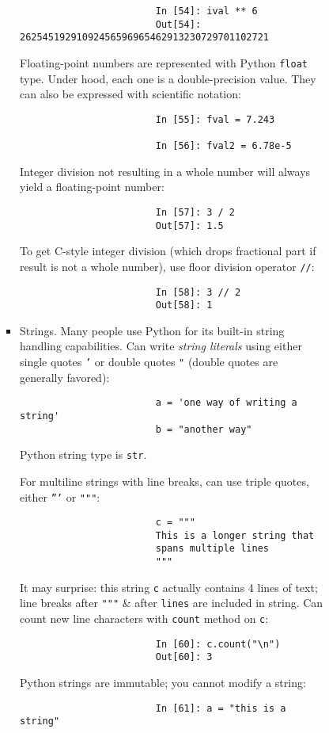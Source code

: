 \documentclass{article}
\begin{document}
\begin{enumerate}
\begin{itemize}
\begin{itemize}
\begin{itemize}
\begin{itemize}
\begin{verbatim}
						In [54]: ival ** 6
						Out[54]: 26254519291092456596965462913230729701102721
					\end{verbatim}
					Floating-point numbers are represented with Python {\tt float} type. Under hood, each one is a double-precision value. They can also be expressed with scientific notation:
					\begin{verbatim}
						In [55]: fval = 7.243
						
						In [56]: fval2 = 6.78e-5
					\end{verbatim}
					Integer division not resulting in a whole number will always yield a floating-point number:
					\begin{verbatim}
						In [57]: 3 / 2
						Out[57]: 1.5
					\end{verbatim}
					To get C-style integer division (which drops fractional part if result is not a whole number), use floor division operator {\tt//}:
					\begin{verbatim}
						In [58]: 3 // 2
						Out[58]: 1
					\end{verbatim}
					\item {\sf Strings.} Many people use Python for its built-in string handling capabilities. Can write {\it string literals} using either single quotes {\tt'} or double quotes {\tt"} (double quotes are generally favored):
					\begin{verbatim}
						a = 'one way of writing a string'
						b = "another way"
					\end{verbatim}
					Python string type is {\tt str}.
					
					For multiline strings with line breaks, can use triple quotes, either {\tt'''} or {\tt"""}:
					\begin{verbatim}
						c = """
						This is a longer string that
						spans multiple lines
						"""
					\end{verbatim}
					It may surprise: this string {\tt c} actually contains 4 lines of text; line breaks after {\tt"""} \& after {\tt lines} are included in string. Can count new line characters with {\tt count} method on {\tt c}:
					\begin{verbatim}
						In [60]: c.count("\n")
						Out[60]: 3
					\end{verbatim}
					Python strings are immutable; you cannot modify a string:
					\begin{verbatim}
						In [61]: a = "this is a string"
						

\end{verbatim}
\end{itemize}
\end{itemize}
\end{itemize}
\end{itemize}
\end{enumerate}
\end{document}
